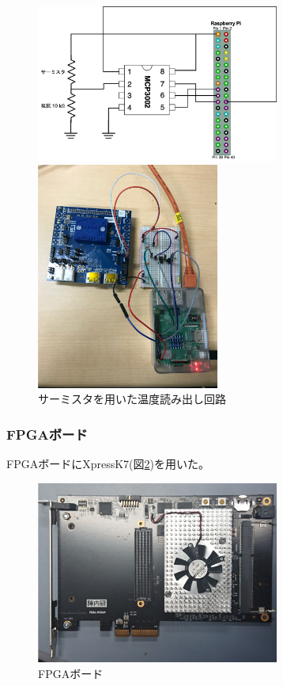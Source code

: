 \begin{figure}[h]\centering
  \begin{minipage}{0.5\hsize}
    \includegraphics[width=8cm]{temp_circit}
  \end{minipage}
  \begin{minipage}{0.5\hsize}
    \includegraphics[width=6cm]{temp_circit_pic}
  \end{minipage}
\caption[サーミスタを用いた温度読み出し回路]{サーミスタを用いた温度読み出し回路}
\label{demo_temp_circit_pic}
\end{figure}

\subsubsection{FPGAボード}

FPGAボードにXpressK7\cite{2}(図\ref{demo_fpga_board})を用いた。
\begin{figure}[h]\centering
\includegraphics[width=8cm]{fpga_board}
\caption[FPGAボード]{FPGAボード}
\label{demo_fpga_board}
\end{figure}

